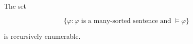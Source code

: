 The set

$$\{ \varphi : \varphi \text{ is a many-sorted sentence and } \models \varphi \}$$

is recursively enumerable.
